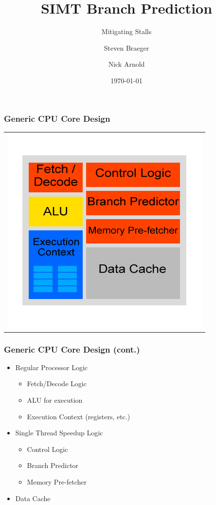 \documentclass{beamer}
\title
{SIMT Branch Prediction}
\subtitle{Mitigating Stalls}
\author
{Steven Braeger \and Nick Arnold}
\institute
{
  \inst{1}%
  University of Central Florida
}
\date
{\today}
\begin{document}
\frame{\titlepage}

\begin{frame}
	\frametitle{Generic CPU Core Design}
	\begin{tabular}{c}
		\includegraphics[width=.75\textwidth]{CPU-design.jpg}
	\end{tabular}
\end{frame}

\begin{frame}
	\frametitle{Generic CPU Core Design (cont.)}
	\begin{itemize}
		\item<1-> Regular Processor Logic
		\begin{itemize}
			\item<2-> Fetch/Decode Logic
			\item<2-> ALU for execution
			\item<2-> Execution Context (registers, etc.)
		\end{itemize}
		\item<3-> Single Thread Speedup Logic
		\begin{itemize}
			\item<4-> Control Logic
			\item<4-> Branch Predictor
			\item<4-> Memory Pre-fetcher
		\end{itemize}
		\item<5-> Data Cache
	\end{itemize}
\end{frame}
\end{document}
